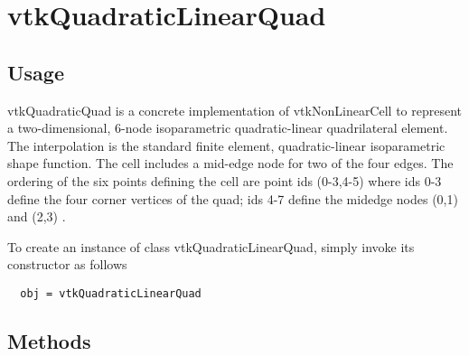 \section{vtkQuadraticLinearQuad}

\subsection{Usage}

 vtkQuadraticQuad is a concrete implementation of vtkNonLinearCell to
 represent a two-dimensional, 6-node isoparametric quadratic-linear quadrilateral
 element. The interpolation is the standard finite element, quadratic-linear
 isoparametric shape function. The cell includes a mid-edge node for two
 of the four edges. The ordering of the six points defining
 the cell are point ids (0-3,4-5) where ids 0-3 define the four corner
 vertices of the quad; ids 4-7 define the midedge nodes (0,1) and (2,3) .


To create an instance of class vtkQuadraticLinearQuad, simply
invoke its constructor as follows
\begin{verbatim}
  obj = vtkQuadraticLinearQuad
\end{verbatim}
\subsection{Methods}

